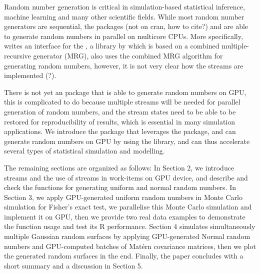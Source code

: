 \documentclass[article,nojss]{jss}\usepackage[]{graphicx}\usepackage[]{color}
\begin{document}
\begin{leftbar}
Random number generation is critical in simulation-based statistical inference, machine learning and many other scientific fields. While most random number generators are sequential, the  packages  (not on cran, how to cite?) and  \citep*{future1.19.1} are able to generate random numbers in parallel on multicore CPUs. More specifically,  writes an interface for the , a  library by \cite{l2002object} which is based on a combined multiple-recursive generator (MRG),  also uses the combined MRG algorithm for generating random numbers, however, it is not very clear how the streams are implemented (?).


There is not yet an  package that is able to generate random numbers on GPU, this is complicated to do because multiple streams will be needed for parallel generation of random numbers, and the stream states need to be able to be restored for reproducibility of results, which is essential in many simulation applications. We introduce the  package  that leverages the  package, and can generate random numbers on GPU by using the  \citep{l2015clrng} library, and can thus accelerate several types of statistical simulation and modelling.

The remaining sections are organized as follows:
In Section 2, we introduce streams and the use of streams in work-items on GPU device, and describe and check the functions for generating uniform and normal random numbers.
In Section 3, we apply GPU-generated uniform random numbers in Monte Carlo simulation for Fisher’s exact test, we parallelise this Monte Carlo simulation and implement it on GPU, then we provide two real data examples to demonstrate the function usage and test its R performance.
Section 4 simulates simultaneously multiple Gaussian random surfaces by applying GPU-generated Normal random numbers and GPU-computed batches of Mat\'ern covariance matrices, then we plot the generated random surfaces in the end. 
Finally, the paper concludes with a short summary and a discussion in Section 5.



\end{leftbar}
\end{document}
